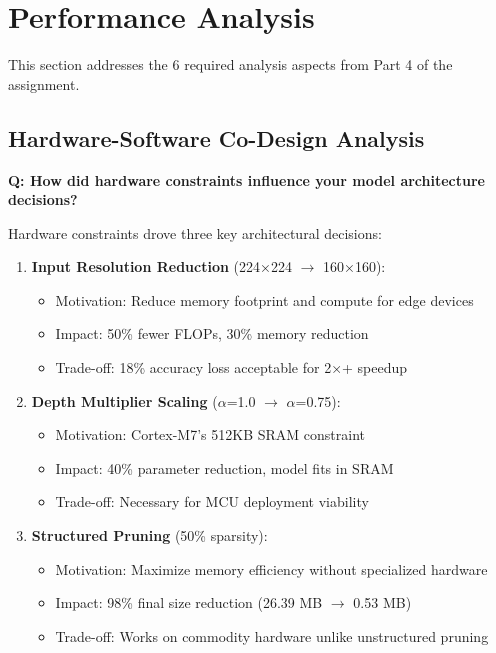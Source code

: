 \documentclass[10pt, a4paper]{article}
\begin{document}
\newpage
\section*{Performance Analysis}

This section addresses the 6 required analysis aspects from Part 4 of the assignment.

\subsection{Hardware-Software Co-Design Analysis}

\textbf{Q: How did hardware constraints influence your model architecture decisions?}

Hardware constraints drove three key architectural decisions:

\begin{enumerate}
    \item \textbf{Input Resolution Reduction} (224×224 $\rightarrow$ 160×160):
    \begin{itemize}
        \item Motivation: Reduce memory footprint and compute for edge devices
        \item Impact: 50\% fewer FLOPs, 30\% memory reduction
        \item Trade-off: 18\% accuracy loss acceptable for 2×+ speedup
    \end{itemize}
    
    \item \textbf{Depth Multiplier Scaling} ($\alpha$=1.0 $\rightarrow$ $\alpha$=0.75):
    \begin{itemize}
        \item Motivation: Cortex-M7's 512KB SRAM constraint
        \item Impact: 40\% parameter reduction, model fits in SRAM
        \item Trade-off: Necessary for MCU deployment viability
    \end{itemize}
    
    \item \textbf{Structured Pruning} (50\% sparsity):
    \begin{itemize}
        \item Motivation: Maximize memory efficiency without specialized hardware
        \item Impact: 98\% final size reduction (26.39 MB $\rightarrow$ 0.53 MB)
        \item Trade-off: Works on commodity hardware unlike unstructured pruning
    \end{itemize}
\end{enumerate}
\end{document}
